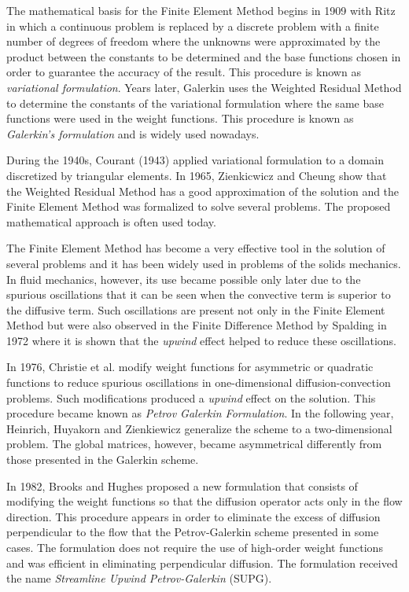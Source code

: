 The mathematical basis for the Finite Element Method begins in 1909
 with Ritz in which a continuous problem is replaced by 
a discrete problem with a finite number of degrees of freedom
 where the unknowns were approximated by the product between
 the constants to be determined and the base functions chosen
 in order to guarantee the accuracy of the result.
 This procedure is known as \textit{variational formulation}.
 Years later, Galerkin uses the Weighted Residual Method
 to determine the constants of the variational formulation
 where the same base functions were used in the weight functions.
 This procedure is known as \textit{Galerkin's formulation} and
 is widely used nowadays.

\medskip
During the 1940s, Courant (1943) \cite{courant1943} applied
 variational formulation to a domain discretized by triangular elements.
 In 1965, Zienkicwicz and Cheung \cite{zienkiewicz1965}
 show that the Weighted Residual Method has a good approximation
 of the solution and the Finite Element Method was formalized
 to solve several problems. The proposed mathematical approach
 is often used today.

\medskip
The Finite Element Method has become a very effective tool
 in the solution of several problems and it has been widely
 used in problems of the solids mechanics.
 In fluid mechanics, however, its use became possible only
 later due to the spurious oscillations that it can be seen
 when the convective term is superior to the diffusive term.
 Such oscillations are present not only in the Finite Element Method
 but were also observed in the Finite Difference Method by
 Spalding in 1972 \cite{spalding1972} where it is shown that
 the \textit{upwind} effect helped to reduce these oscillations.

\medskip
In 1976, Christie et al. \cite{christie1976} modify weight
 functions for asymmetric or quadratic functions to reduce
 spurious oscillations in one-dimensional diffusion-convection problems.
 Such modifications produced a \textit{upwind} effect on the solution.
 This procedure became known as \textit{Petrov Galerkin Formulation}.
 In the following year, Heinrich, Huyakorn and Zienkiewicz
 \cite{heinrich1977} generalize the scheme to a two-dimensional problem.
 The global matrices, however, became asymmetrical differently
 from those presented in the Galerkin scheme.

\medskip
In 1982, Brooks and Hughes \cite{brooks1982} proposed a
 new formulation that consists of modifying the weight functions
 so that the diffusion operator acts only in the flow direction.
 This procedure appears in order to eliminate the excess of
 diffusion perpendicular to the flow that
 the Petrov-Galerkin scheme presented in some cases.
 The formulation does not require the use of high-order
 weight functions and was efficient in eliminating perpendicular
 diffusion. The formulation received the name
 \textit{Streamline Upwind Petrov-Galerkin} (SUPG).


